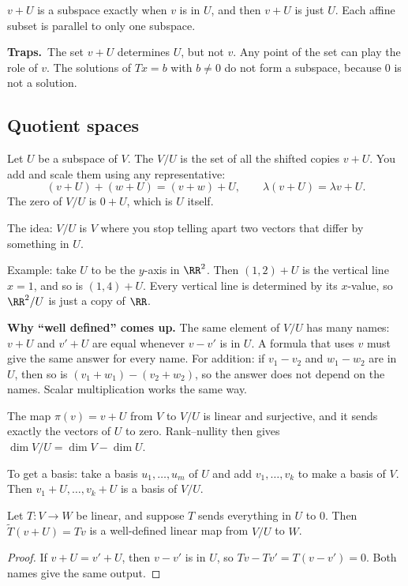 \documentclass[11pt]{scrartcl}
\newcommand{\traps}{\par\medskip\noindent\textbf{\color{RawSienna}Traps.}\ }
\begin{document}
\begin{proposition*}[HW4 P6, Prop.~38]
  $v+U$ is a subspace exactly when $v$ is in $U$, and then $v+U$ is just $U$.
  Each affine subset is parallel to only one subspace.
\end{proposition*}

\traps The set $v+U$ determines $U$, but not $v$. Any point of the set can play the role of $v$.
The solutions of $Tx=b$ with $b\ne0$ do not form a subspace, because $0$ is not a solution.

\subsection{Quotient spaces}
\begin{definition*}
  Let $U$ be a subspace of $V$. The  $V/U$ is the set of all the shifted copies $v+U$.
  You add and scale them using any representative:
  \[ (v+U)+(w+U)=(v+w)+U,\qquad \lambda(v+U)=\lambda v+U. \]
  The zero of $V/U$ is $0+U$, which is $U$ itself.
\end{definition*}
The idea: $V/U$ is $V$ where you stop telling apart two vectors that differ by something in $U$.

Example: take $U$ to be the $y$-axis in $\RR^2$. Then $(1,2)+U$ is the vertical line $x=1$, and so is $(1,4)+U$. Every vertical line is determined by its $x$-value, so $\RR^2/U$ is just a copy of $\RR$.

\textbf{Why ``well defined'' comes up.}
The same element of $V/U$ has many names: $v+U$ and $v'+U$ are equal whenever $v-v'$ is in $U$.
A formula that uses $v$ must give the same answer for every name.
For addition: if $v_1-v_2$ and $w_1-w_2$ are in $U$, then so is $(v_1+w_1)-(v_2+w_2)$, so the answer does not depend on the names. Scalar multiplication works the same way.

\begin{proposition*}[LADR 3.104, 3.105]
  The map $\pi(v)=v+U$ from $V$ to $V/U$ is linear and surjective, and it sends exactly the vectors of $U$ to zero.
  Rank--nullity then gives $\dim V/U=\dim V-\dim U$.

  To get a basis: take a basis $u_1,\dots,u_m$ of $U$ and add $v_1,\dots,v_k$ to make a basis of $V$. Then $v_1+U,\dots,v_k+U$ is a basis of $V/U$.
\end{proposition*}

\begin{proposition*}[HW5 P2]
  Let $T\colon V\to W$ be linear, and suppose $T$ sends everything in $U$ to $0$.
  Then $\tilde T(v+U)=Tv$ is a well-defined linear map from $V/U$ to $W$.
\end{proposition*}
\begin{proof}
  If $v+U=v'+U$, then $v-v'$ is in $U$, so $Tv-Tv'=T(v-v')=0$. Both names give the same output.
\end{proof}
\end{document}

